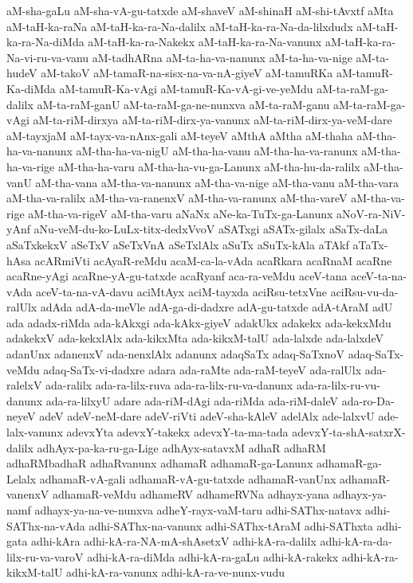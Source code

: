 {aM-sha-gaLu
aM-sha-vA-gu-tatxde
aM-shaveV
aM-shinaH
aM-shi-tAvxtf
aMta
aM-taH-ka-raNa
aM-taH-ka-ra-Na-dalilx
aM-taH-ka-ra-Na-da-lilxdudx
aM-taH-ka-ra-Na-diMda
aM-taH-ka-ra-Nakekx
aM-taH-ka-ra-Na-vanunx
aM-taH-ka-ra-Na-vi-ru-va-vanu
aM-tadhARna
aM-ta-ha-va-nanunx
aM-ta-ha-va-nige
aM-ta-hudeV
aM-takoV
aM-tamaR-na-sisx-na-va-nA-giyeV
aM-tamuRKa
aM-tamuR-Ka-diMda
aM-tamuR-Ka-vAgi
aM-tamuR-Ka-vA-gi-ve-yeMdu
aM-ta-raM-ga-dalilx
aM-ta-raM-ganU
aM-ta-raM-ga-ne-nunxva
aM-ta-raM-ganu
aM-ta-raM-ga-vAgi
aM-ta-riM-dirxya
aM-ta-riM-dirx-ya-vanunx
aM-ta-riM-dirx-ya-veM-dare
aM-tayxjaM
aM-tayx-va-nAnx-gali
aM-teyeV
aMthA
aMtha
aM-thaha
aM-tha-ha-va-nanunx
aM-tha-ha-va-nigU
aM-tha-ha-vanu
aM-tha-ha-va-ranunx
aM-tha-ha-va-rige
aM-tha-ha-varu
aM-tha-ha-vu-ga-Lanunx
aM-tha-hu-da-ralilx
aM-tha-vanU
aM-tha-vana
aM-tha-va-nanunx
aM-tha-va-nige
aM-tha-vanu
aM-tha-vara
aM-tha-va-ralilx
aM-tha-va-ranenxV
aM-tha-va-ranunx
aM-tha-vareV
aM-tha-va-rige
aM-tha-va-rigeV
aM-tha-varu
aNaNx
aNe-ka-TuTx-ga-Lanunx
aNoV-ra-NiV-yAnf
aNu-veM-du-ko-LuLx-titx-dedxVvoV
aSATxgi
aSATx-gilalx
aSaTx-daLa
aSaTxkekxV
aSeTxV
aSeTxVnA
aSeTxlAlx
aSuTx
aSuTx-kAla
aTAkf
aTaTx-hAsa
acARmiVti
acAyaR-reMdu
acaM-ca-la-vAda
acaRkara
acaRnaM
acaRne
acaRne-yAgi
acaRne-yA-gu-tatxde
acaRyanf
aca-ra-veMdu
aceV-tana
aceV-ta-na-vAda
aceV-ta-na-vA-davu
aciMtAyx
aciM-tayxda
aciRsu-tetxVne
aciRsu-vu-da-ralUlx
adAda
adA-da-meVle
adA-ga-di-dadxre
adA-gu-tatxde
adA-tAraM
adU
ada
adadx-riMda
ada-kAkxgi
ada-kAkx-giyeV
adakUkx
adakekx
ada-kekxMdu
adakekxV
ada-kekxlAlx
ada-kikxMta
ada-kikxM-talU
ada-lalxde
ada-lalxdeV
adanUnx
adanenxV
ada-nenxlAlx
adanunx
adaqSaTx
adaq-SaTxnoV
adaq-SaTx-veMdu
adaq-SaTx-vi-dadxre
adara
ada-raMte
ada-raM-teyeV
ada-ralUlx
ada-ralelxV
ada-ralilx
ada-ra-lilx-ruva
ada-ra-lilx-ru-va-danunx
ada-ra-lilx-ru-vu-danunx
ada-ra-lilxyU
adare
ada-riM-dAgi
ada-riMda
ada-riM-daleV
ada-ro-Da-neyeV
adeV
adeV-neM-dare
adeV-riVti
adeV-sha-kAleV
adelAlx
ade-lalxvU
ade-lalx-vanunx
adevxYta
adevxY-takekx
adevxY-ta-ma-tada
adevxY-ta-shA-satxrX-dalilx
adhAyx-pa-ka-ru-ga-Lige
adhAyx-satavxM
adhaR
adhaRM
adhaRMbadhaR
adhaRvanunx
adhamaR
adhamaR-ga-Lanunx
adhamaR-ga-Lelalx
adhamaR-vA-gali
adhamaR-vA-gu-tatxde
adhamaR-vanUnx
adhamaR-vanenxV
adhamaR-veMdu
adhameRV
adhameRVNa
adhayx-yana
adhayx-ya-namf
adhayx-ya-na-ve-nunxva
adheY-rayx-vaM-taru
adhi-SAThx-natavx
adhi-SAThx-na-vAda
adhi-SAThx-na-vanunx
adhi-SAThx-tAraM
adhi-SAThxta
adhi-gata
adhi-kAra
adhi-kA-ra-NA-mA-shAsetxV
adhi-kA-ra-dalilx
adhi-kA-ra-da-lilx-ru-va-varoV
adhi-kA-ra-diMda
adhi-kA-ra-gaLu
adhi-kA-rakekx
adhi-kA-ra-kikxM-talU
adhi-kA-ra-vanunx
adhi-kA-ra-ve-nunx-vudu
}
